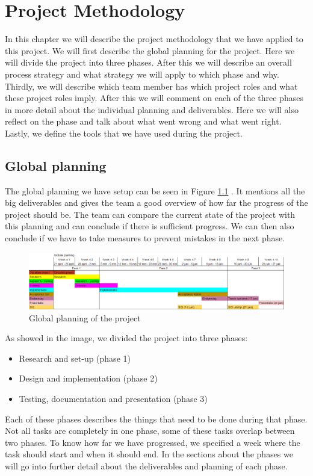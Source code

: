 \chapter{Project Methodology}
\label{sec:methodology}
In this chapter we will describe the project methodology that we have applied to this project.
We will first describe the global planning for the project.
Here we will divide the project into three phases.
After this we will describe an overall process strategy and what strategy we will apply to which phase and why.
Thirdly, we will describe which team member has which project roles and what these project roles imply.
After this we will comment on each of the three phases in more detail about the individual planning and deliverables.
Here we will also reflect on the phase and talk about what went wrong and what went right.
Lastly, we define the tools that we have used during the project.

\section{Global planning}
The global planning we have setup can be seen in Figure \ref{global_planning} .
It mentions all the big deliverables and gives the team a good overview of how far the progress of the project should be.
The team can compare the current state of the project with this planning and can conclude if there is sufficient progress.
We can then also conclude if we have to take measures to prevent mistakes in the next phase.

\begin{figure}[h]
    \centering
    \includegraphics[width=\textwidth]{images/Global_planning}
    \caption{Global planning of the project}
    \label{global_planning}
\end{figure}

As showed in the image, we divided the project into three phases:
\begin{itemize}
\item Research and set-up (phase 1)
\item Design and implementation (phase 2)
\item Testing, documentation and presentation (phase 3)
\end{itemize}
Each of these phases describes the things that need to be done during that phase.
Not all tasks are completely in one phase, some of these tasks overlap between two phases.
To know how far we have progressed, we specified a week where the task should start and when it should end.
In the sections about the phases we will go into further detail about the deliverables and planning of each phase.

